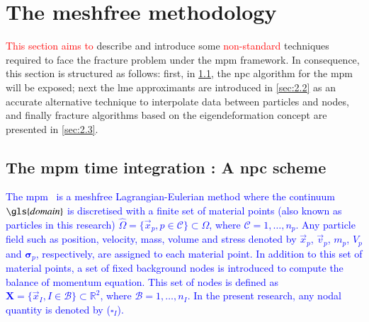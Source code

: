 \documentclass[preprint,12pt,a4paper]{elsarticle}
\newcommand{\tens}[1]{
  \ensuremath{\mathbf{{#1}}}
}
\begin{document}
\section{The meshfree methodology}
\label{sec:2}

\textcolor{red}{This section aims to} describe and introduce some \textcolor{red}{non-standard}
techniques required to face the fracture problem under the \acrshort{mpm}
framework. In consequence, this section is structured as follows: first, in
\ref{sec:2.1}, the \acrfull{npc} algorithm for the \acrshort{mpm}
will be exposed; next the \acrshort{lme} approximants are
introduced in \ref{sec:2.2} as an accurate alternative technique to
interpolate data between particles and nodes, and finally fracture
algorithms based on the eigendeformation concept are presented in
\ref{sec:2.3}.

\subsection{The \acrshort{mpm} time integration : A \acrlong{npc}  scheme}
\label{sec:2.1}

\textcolor{blue}{The \acrshort{mpm}~\cite{Sulsky1994} is a meshfree Lagrangian-Eulerian method where the continuum $\gls{domain}$ is discretised with a finite set of material points (also known as particles in this research) $\hat{\Omega} = \{ \vec{x}_p, p \in \mathcal{C} \} \subset \Omega$, where $\mathcal{C} = 1, \ldots, n_p$. Any particle field such as position, velocity, mass, volume and stress denoted by $\vec{x}_p$, $\vec{v}_p$, $m_p$, $V_p$ and $\tens{\sigma}_p$, respectively, are assigned to each material point.  In addition to this set of material points, a set of fixed background nodes is introduced to compute the balance of momentum equation. This set of nodes is defined as  $\textbf{X} = \{ \vec{x}_I, I \in \mathcal{B} \} \subset \mathbb{R}^{2}$, where $\mathcal{B} = 1, \ldots, n_I$. In the present research, any nodal quantity is denoted by ($\square_I$).}
\end{document}
